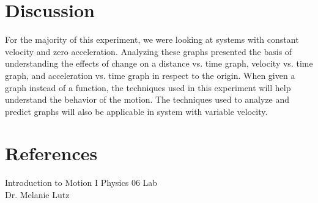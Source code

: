 \documentclass[aps,letterpaper,11pt]{revtex4}
\begin{document}
\section{Discussion} 

For the majority of this experiment, we were looking at systems with constant velocity and zero acceleration. Analyzing these graphs presented the basis of understanding the effects of change on a distance vs. time graph, velocity vs. time graph, and acceleration vs. time graph in respect to the origin. When given a graph instead of a function, the techniques used in this experiment will help understand the behavior of the motion. The techniques used to analyze and predict graphs will also be applicable in system with variable velocity. 



\section{References}

\hspace{-6.5mm}
Introduction to Motion I Physics 06 Lab\\
Dr. Melanie Lutz
\end{document}
